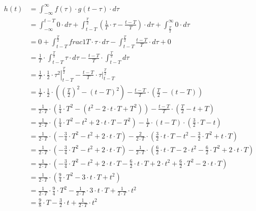 \begin{task}
\begin{align*}
h(t)&=\int_{-\infty}^{\infty} f(\tau) \cdot g(t-\tau) \cdot d\tau\\
&=\int_{-\infty}^{t-T} 0 \cdot d\tau 
+ \int_{t-T}^{\frac{T}{2}}\left( \frac{1}{T}\cdot \tau - \frac{t-T}{T} \right)\cdot d\tau 
+\int_{\frac{T}{2}}^{\infty} 0 \cdot d\tau\\
&=0
+ \int_{t-T}^{\frac{T}{2}} frac{1}{T}\cdot \tau \cdot d\tau - \int_{t-T}^{\frac{T}{2}} \frac{t-T}{T} \cdot d\tau 
+0\\
&=\frac{1}{T}\cdot \int_{t-T}^{\frac{T}{2}}  \tau \cdot d\tau - \frac{t-T}{T} \cdot \int_{t-T}^{\frac{T}{2}}  d\tau\\
&=\frac{1}{T}\cdot \left. \frac{1}{2} \cdot \tau^2 \right|_{t-T}^{\frac{T}{2}} - \frac{t-T}{T} \cdot \left.  \tau \right|_{t-T}^{\frac{T}{2}}\\
&=\frac{1}{T}\cdot \frac{1}{2} \cdot \left(  \left(\frac{T}{2}\right)^2 - \left(t-T\right)^2\right) - \frac{t-T}{T} \cdot \left(  \frac{T}{2} - \left(t-T\right)\right)\\
&=\frac{1}{2 \cdot T} \cdot \left(  \frac{1}{4}\cdot T^2 - \left(t^2 -2\cdot t \cdot T + T^2 \right)\right) - \frac{t-T}{T} \cdot \left(  \frac{T}{2} - t+T\right)\\
&=\frac{1}{2 \cdot T} \cdot \left(  \frac{1}{4}\cdot T^2 -t^2 +2\cdot t \cdot T - T^2 \right) - \frac{1}{T} \cdot \left(t-T\right)\cdot \left(  \frac{3}{2}\cdot T - t\right)\\
&=\frac{1}{2 \cdot T} \cdot \left(  -\frac{3}{4}\cdot T^2 -t^2 +2\cdot t \cdot T \right) - \frac{2}{2\cdot T} \cdot \left(\frac{3}{2} \cdot t \cdot T - t^2 - \frac{3}{2}\cdot T^2 + t \cdot T\right)\\
&=\frac{1}{2 \cdot T} \cdot \left(  -\frac{3}{4}\cdot T^2 -t^2 +2\cdot t \cdot T \right) - \frac{1}{2 \cdot T} \cdot \left(\frac{6}{2} \cdot t \cdot T - 2\cdot t^2 - \frac{6}{2}\cdot T^2 + 2\cdot t \cdot T\right)\\
&=\frac{1}{2 \cdot T} \cdot \left(  -\frac{3}{4}\cdot T^2 -t^2 +2\cdot t \cdot T  - \frac{6}{2} \cdot t \cdot T + 2\cdot t^2 + \frac{6}{2}\cdot T^2 - 2\cdot t \cdot T\right)\\
&=\frac{1}{2 \cdot T} \cdot \left(  \frac{9}{4}\cdot T^2 -3\cdot t \cdot T  +  t^2 \right)\\
&=\frac{1}{2 \cdot T} \cdot  \frac{9}{4}\cdot T^2 - \frac{1}{2 \cdot T} \cdot 3\cdot t \cdot T  +  \frac{1}{2 \cdot T} \cdot t^2\\
&=\frac{9}{8}\cdot T - \frac{3}{2} \cdot t  +  \frac{1}{2 \cdot T} \cdot t^2\\
\end{align*}


\end{task}
